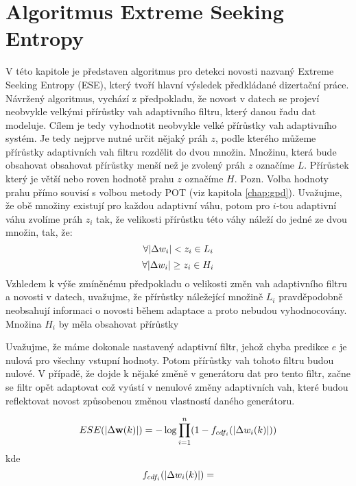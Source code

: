 \chapter{Algoritmus Extreme Seeking Entropy}
V této kapitole je představen algoritmus pro detekci novosti nazvaný Extreme Seeking Entropy (ESE), který tvoří hlavní výsledek předkládané dizertační práce. Návržený algoritmus, vychází z předpokladu, že novost v datech se projeví neobvykle velkými přírůstky vah adaptivního filtru, který danou řadu dat modeluje. Cílem je tedy vyhodnotit neobvykle velké přírůstky vah adaptivního systém. Je tedy nejprve nutné určit nějaký práh $z$, podle kterého můžeme přírůstky adaptivních vah filtru rozdělit do dvou množin. Množinu, která bude obsahovat obsahovat přírůstky menší než je zvolený práh $z$ označíme $L$. Přírůstek který je větší nebo roven hodnotě prahu $z$ označíme $H$. Pozn. Volba hodnoty prahu přímo souvisí s volbou metody POT (viz kapitola \ref{chap:gpd}). Uvažujme, že obě množiny existují pro každou adaptivní váhu, potom pro $i$-tou adaptivní váhu zvolíme práh $z_i$ tak, že velikosti přírůstku této váhy náleží do jedné ze dvou množin, tak, že:
\begin{equation}
\forall \lvert\Delta w_i\rvert < z_i \in L_i
\end{equation}
\begin{equation}
\forall \lvert\Delta w_i\rvert \geq z_i \in H_i
\end{equation}
Vzhledem k výše zmíněnému předpokladu o velikosti změn vah adaptivního filtru a novosti v datech, uvažujme, že přírůstky náležející množině $L_i$ pravděpodobně neobsahují informaci o novosti během adaptace a proto nebudou vyhodnocovány. Množina $H_i$ by měla obsahovat přírůstky

\par Uvažujme, že máme dokonale nastavený adaptivní filtr, jehož chyba predikce $e$ je nulová pro všechny vstupní hodnoty. Potom přírůstky vah tohoto filtru budou nulové. V případě, že dojde k nějaké změně v generátoru dat pro tento filtr, začne se filtr opět adaptovat což vyústí v nenulové změny adaptivních vah, které budou reflektovat novost způsobenou změnou vlastností daného generátoru.

\begin{equation}
ESE(\lvert\Delta \textbf{w}(k)\rvert)=-\log \prod_{i=1}^n(1-f_{cdf_i}(\lvert\Delta w_i(k)\rvert))
\end{equation}
kde
\begin{equation}
f_{cdf_i}(\lvert\Delta w_i(k)\rvert)=
\end{equation}